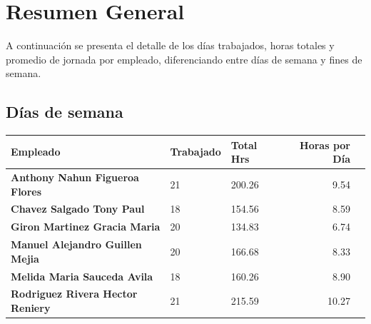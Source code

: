\documentclass[11pt,a4paper]{article}
\newcommand{\infobox}[2]{
  \begin{tcolorbox}[
    colback=grisclaro,
    colframe=corporativo,
    title=#1,
    fonttitle=\bfseries
  ]
#2
  \end{tcolorbox}
}
\newcommand{\mejoradatabla}[1]{
  \renewcommand{\arraystretch}{1.3}
  \setlength{\tabcolsep}{10pt}
#1
  \renewcommand{\arraystretch}{1}
  \setlength{\tabcolsep}{6pt}
}
\begin{document}
\tableofcontents
\clearpage


\section{Resumen General}

\infobox{Horas trabajadas por período, tipo de día y empleado}{
  A continuación se presenta el detalle de los días trabajados, horas totales y promedio de jornada por empleado, diferenciando entre días de semana y fines de semana.
}


\subsection{Días de semana}

\vspace{0.5cm}
\begin{table}[H]
\centering
\mejoradatabla{
\begin{tabular}{>{\bfseries}lllrr}
\toprule
\rowcolor{grisclaro} \textbf{Empleado} & \textbf{Trabajado} & \textbf{Total Hrs} & \textbf{Horas por Día}\\
\midrule


Anthony Nahun Figueroa Flores & 21 & 200.26 & 9.54\\



Chavez Salgado Tony Paul & 18 & 154.56 & 8.59\\



Giron Martinez Gracia Maria & 20 & 134.83 & 6.74\\



Manuel Alejandro Guillen Mejia & 20 & 166.68 & 8.33\\



Melida Maria Sauceda Avila & 18 & 160.26 & 8.90\\



Rodriguez Rivera Hector Reniery & 21 & 215.59 & 10.27\\












\bottomrule
\end{tabular}
}
\end{table}
\end{document}
